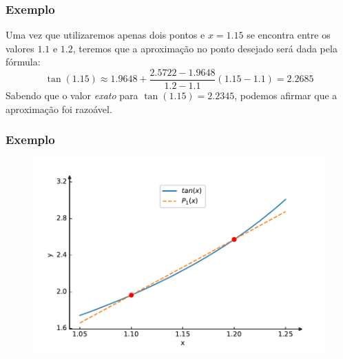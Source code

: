 \documentclass{beamer}
\theoremstyle{mystyle}
\begin{document}
\begin{frame}
	\frametitle{Exemplo}
	Uma vez que utilizaremos apenas dois pontos e $ x = 1.15 $ se encontra entre os valores $ 1.1 $ e $ 1.2 $, teremos que a aproximação no ponto desejado será dada pela fórmula:
	\begin{equation*}
		\tan(1.15) \approx  1.9648 + \dfrac{2.5722 - 1.9648}{ 1.2 - 1.1}(1.15 - 1.1) = 2.2685
	\end{equation*}
	Sabendo que o valor \textit{exato} para $ \tan(1.15) = 2.2345 $, podemos afirmar que a aproximação foi razoável.
\end{frame}

\begin{frame}
	\frametitle{Exemplo}
	\begin{figure}
		\centering
		\includegraphics[width=0.9\linewidth]{Figuras/grafico_03}
		\label{fig:grafico03}
	\end{figure}
\end{frame}
\end{document}
